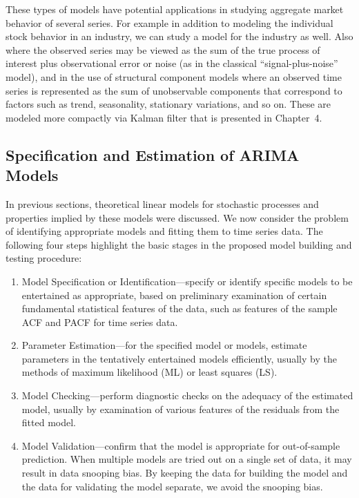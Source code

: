 These types of models have potential applications in studying aggregate market behavior of several series. For example in addition to modeling the individual stock behavior in an industry, we can study a model for the industry as well. Also where the observed series may be viewed as the sum of the true process of interest plus observational error or noise (as in the classical ``signal-plus-noise'' model), and in the use of structural component models where an observed time series is represented as the sum of unobservable components that correspond to factors such as trend, seasonality, stationary variations, and so on. These are modeled more compactly via Kalman filter that is presented in Chapter~4. 


\subsection{Specification and Estimation of ARIMA Models}


In previous sections, theoretical linear models for stochastic processes and properties implied by these models were discussed. We now consider the problem of identifying appropriate models and fitting them to time series data. The following four steps highlight the basic stages in the proposed model building and testing procedure:
\begin{enumerate}
\item Model Specification or Identification---specify or identify specific models to be entertained as appropriate, based on preliminary examination of certain fundamental statistical features of the data, such as features of the sample ACF and PACF for time series data.

\item Parameter Estimation---for the specified model or models, estimate parameters in the tentatively entertained models efficiently, usually by the methods of maximum likelihood (ML) or least squares (LS).

\item Model Checking---perform diagnostic checks on the adequacy of the estimated model, usually by examination of various features of the residuals from the fitted model.

\item Model Validation---confirm that the model is appropriate for out-of-sample prediction. When multiple models are tried out on a single set of data, it may result in data snooping bias. By keeping the data for building the model and the data for validating the model separate, we avoid the snooping bias.
\end{enumerate}


